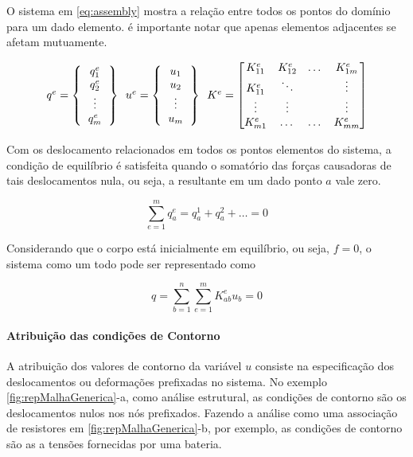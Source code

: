   O sistema em \ref{eq:assembly} mostra a relação entre todos os pontos do domínio para um dado elemento. é importante notar que apenas elementos adjacentes se afetam mutuamente.
  
 \begin{equation}
 	\label{eq:assembly}
 	\begin{tabular}{c c c}
 	$q^e = 
		\left \{
 		\begin{tabular}{c}
	 		$q^e_1$ \\
	 		$q^e_2$ \\
	 		\vdots \\
	 		$q^e_m$
  		\end{tabular} 		
		\right \}$
		\
 	$u^e = 
		\left \{
 		\begin{tabular}{c}
	 		$u_1$ \\
	 		$u_2$ \\
	 		\vdots \\
	 		$u_m$
  		\end{tabular} 		
		\right \}	$
		\
		$K^e =
		\begin{bmatrix}
		    K^e_{11} 	& K^e_{12}  & \dots 	& K^e_{1m} \\
		    K^e_{11} 	& \ddots  & \ 	& \vdots \\
		    \vdots 	& \vdots  	 & \ 	& \vdots \\
		    K^e_{m1} 	& \dots   & \dots 	& K^e_{mm} 
		\end{bmatrix}	 $		
	\end{tabular} 
 \end{equation}
 
 Com os deslocamento relacionados em todos os pontos elementos do sistema,
 a condição de equilíbrio é satisfeita quando o somatório das forças causadoras de tais deslocamentos nula, ou seja, a resultante em um dado ponto $a$ vale zero.
 
  \begin{equation}
  	\label{eq:somaForcas}
 	\sum_{e=1}^{m}{q_a^e = q_a^1 + q_a^2 + \dots = 0}
  \end{equation}
  
  Considerando que o corpo está inicialmente em equilíbrio, ou seja, $f = 0$, o sistema como um todo pode ser representado como 
  
    \begin{equation}
    	\label{eq:equilibrio}
    	q =
   		\sum_{b=1}^{n}\sum_{e=1}^{m}{K_{ab}^e u_b = 0}
    \end{equation}
    
    
\paragraph{Atribuição das condições de Contorno}
A atribuição dos valores de contorno da variável $u$ consiste na especificação dos deslocamentos ou deformações prefixadas no sistema. No exemplo \ref{fig:repMalhaGenerica}-a, como análise estrutural, as condições de contorno são os deslocamentos nulos nos nós prefixados. Fazendo a análise como uma associação de resistores em \ref{fig:repMalhaGenerica}-b, por exemplo, as condições de contorno são as a tensões fornecidas por uma bateria.

